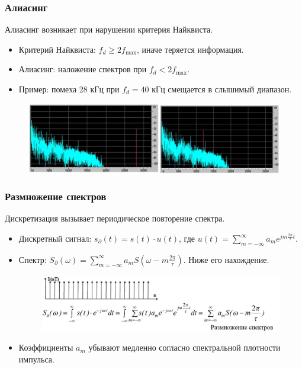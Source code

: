 	\subsubsection{Алиасинг}
	\vspace{-0.5em}
	Алиасинг возникает при нарушении критерия Найквиста.
	\vspace{-0.5em}
	\begin{itemize}
		\item Критерий Найквиста: $f_d \geq 2f_{\text{max}}$, иначе теряется информация.
		\vspace{-0.5em}
		\item Алиасинг: наложение спектров при $f_d < 2f_{\text{max}}$.
		\vspace{-0.5em}
		\item Пример: помеха 28 кГц при $f_d = 40$ кГц смещается в слышимый диапазон.
	\end{itemize}
	\vspace{-1em}
	\begin{figure}[H]
		\centering
		\includegraphics[width=1\linewidth, height=0.2\textheight]{img/03_10}
		\label{fig:03_10}
	\end{figure}
	
	\newpage
	
	\subsubsection{Размножение спектров}
	Дискретизация вызывает периодическое повторение спектра.
	\begin{itemize}
		\item Дискретный сигнал: $s_{\partial}(t) = s(t) \cdot u(t)$, где $u(t) = \sum\limits_{m=-\infty}^{\infty} a_m e^{j m \frac{2\pi}{\tau} t}$.
		\item Спектр: $S_{\partial}(\omega) = \sum\limits_{m=-\infty}^{\infty} a_m S\left(\omega - m \frac{2\pi}{\tau}\right)$. Ниже его нахождение.
		\vspace{-1em}
		\begin{figure}[H]
			\centering
			\includegraphics[width=0.9\linewidth, height=0.14\textheight]{img/03_11}
			\label{fig:03_11}
		\end{figure}
		\vspace{-2em}
		\item Коэффициенты $a_m$ убывают медленно согласно спектральной плотности импульса.
	\end{itemize}
	
